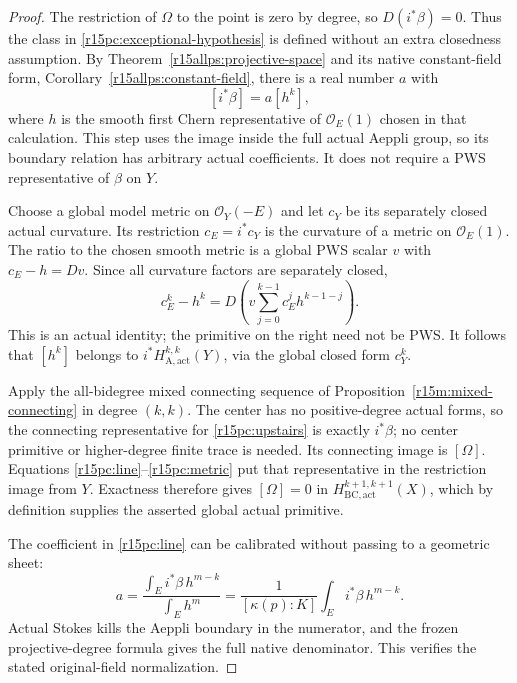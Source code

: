 \begin{proof}
The restriction of $\Omega$ to the point is zero by degree,
so $D(i^*\beta)=0$.  Thus the class in
\eqref{r15pc:exceptional-hypothesis} is defined without an
extra closedness assumption.  By
Theorem~\ref{r15allps:projective-space} and its native
constant-field form, Corollary~\ref{r15allps:constant-field},
there is a
real number $a$ with
\[
                           [i^*\beta]=a[h^k],
\tag{EP15.3}\label{r15pc:line}
\]
where $h$ is the smooth first Chern representative of
$\mathcal O_E(1)$ chosen in that calculation.  This step uses
the image inside the full actual Aeppli group, so its
boundary relation has arbitrary actual coefficients.
It does not require a PWS representative of $\beta$ on $Y$.

Choose a global model metric on $\mathcal O_Y(-E)$ and let
$c_Y$ be its separately closed actual curvature.  Its
restriction $c_E=i^*c_Y$ is the curvature of a metric on
$\mathcal O_E(1)$.  The ratio to the chosen smooth metric is
a global PWS scalar $v$ with $c_E-h=Dv$.  Since all curvature
factors are separately closed,
\[
 c_E^k-h^k
   =D\left(v\sum_{j=0}^{k-1}c_E^j h^{k-1-j}\right).
\tag{EP15.4}\label{r15pc:metric}
\]
This is an actual identity; the primitive on the right need
not be PWS.  It follows that $[h^k]$ belongs to
$i^*H_{\mathrm A,\mathrm{act}}^{k,k}(Y)$, via the global
closed form $c_Y^k$.

Apply the all-bidegree mixed connecting sequence of
Proposition~\ref{r15m:mixed-connecting} in degree $(k,k)$.
The center has no positive-degree actual forms, so the
connecting representative for \eqref{r15pc:upstairs} is
exactly $i^*\beta$; no center primitive or higher-degree
finite trace is needed.  Its connecting image is $[\Omega]$.
Equations \eqref{r15pc:line}--\eqref{r15pc:metric} put that
representative in the restriction image from $Y$.  Exactness
therefore gives $[\Omega]=0$ in
$H_{\mathrm{BC,act}}^{k+1,k+1}(X)$, which by definition
supplies the asserted global actual primitive.

The coefficient in \eqref{r15pc:line} can be calibrated
without passing to a geometric sheet:
\[
             a=\frac{\displaystyle\int_E i^*\beta\,h^{m-k}}
                        {\displaystyle\int_E h^m}
              =\frac{1}{[\kappa(p):K]}
                        \int_E i^*\beta\,h^{m-k}.
\tag{EP15.5}\label{r15pc:native}
\]
Actual Stokes kills the Aeppli boundary in the numerator,
and the frozen projective-degree formula gives the full
native denominator.  This verifies the stated original-field
normalization.
\end{proof}

